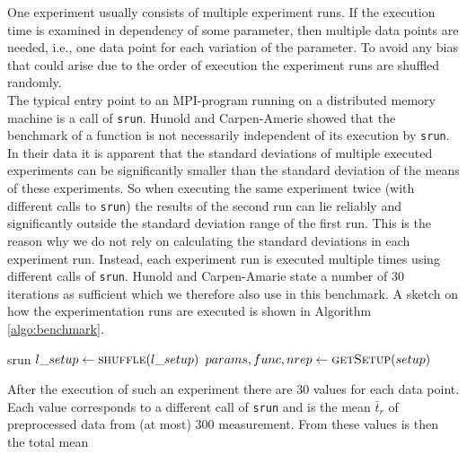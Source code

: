 One experiment usually consists of multiple experiment runs. If the execution time  is examined in dependency of some parameter, then multiple data points are needed, i.e., one data point for each variation of the parameter. To avoid any bias that could arise due to the order of execution the experiment runs are shuffled randomly.\\
The typical entry point to an MPI-program running on a distributed memory machine is a call of \texttt{srun}. Hunold and Carpen-Amerie \cite{HunoldBench} showed that the benchmark of a function is not necessarily independent of its execution by \texttt{srun}. In their data it is apparent that the standard deviations of  multiple executed experiments can be significantly smaller than the standard deviation of the means of these experiments. So when executing the same experiment twice (with different calls to \texttt{srun}) the results of the second run can lie reliably and significantly outside the standard deviation range of the first run. This is the reason why we do not rely on calculating the standard deviations in each experiment run. Instead, each experiment run is executed multiple times using different calls of \texttt{srun}. Hunold and Carpen-Amarie state a number of 30 iterations as sufficient which we therefore also use in this benchmark. A sketch on how the experimentation runs are executed is shown in Algorithm \ref{algo:benchmark}.
\begin{algorithm}
	\caption{– Benchmark of an experiment\\
		\textit{l\_setup}: List of setup parameter}
	\label{algo:benchmark}
	\begin{algorithmic}[1]
		\State {} 
		\State srun 
		\EndFor
		\EndProcedure			
		\State $l\_setup \gets \Call{shuffle}{l\_setup}$
		\State $params, func, nrep \gets \Call{getSetup}{setup}$
		\State {}
		\EndFor
		\EndProcedure
	\end{algorithmic}
\end{algorithm}
After the execution of such an experiment there are 30 values for each data point. Each value corresponds to a different call of \texttt{srun} and is the mean $\bar{t}_r$ of preprocessed data from (at most) 300 measurement. From these values is then the total mean
